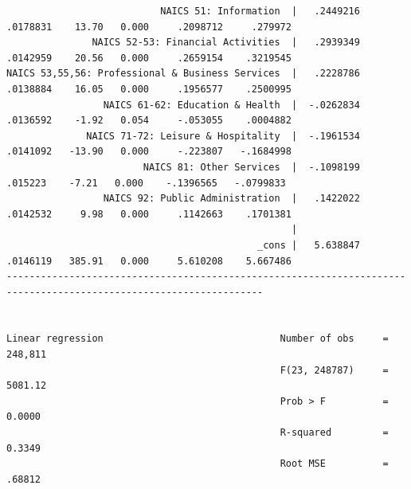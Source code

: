\documentclass[
]{book}
\begin{document}
\begin{verbatim}
                           NAICS 51: Information  |   .2449216   .0178831    13.70   0.000     .2098712     .279972
               NAICS 52-53: Financial Activities  |   .2939349   .0142959    20.56   0.000     .2659154    .3219545
NAICS 53,55,56: Professional & Business Services  |   .2228786   .0138884    16.05   0.000     .1956577    .2500995
                 NAICS 61-62: Education & Health  |  -.0262834   .0136592    -1.92   0.054     -.053055    .0004882
              NAICS 71-72: Leisure & Hospitality  |  -.1961534   .0141092   -13.90   0.000     -.223807   -.1684998
                        NAICS 81: Other Services  |  -.1098199    .015223    -7.21   0.000    -.1396565   -.0799833
                 NAICS 92: Public Administration  |   .1422022   .0142532     9.98   0.000     .1142663    .1701381
                                                  |
                                            _cons |   5.638847   .0146119   385.91   0.000     5.610208    5.667486
-------------------------------------------------------------------------------------------------------------------


Linear regression                               Number of obs     =    248,811
                                                F(23, 248787)     =    5081.12
                                                Prob > F          =     0.0000
                                                R-squared         =     0.3349
                                                Root MSE          =     .68812


\end{verbatim}
\end{document}

